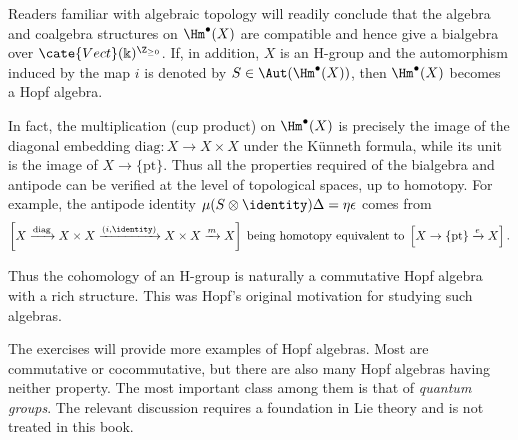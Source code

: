 \begin{example}[H.\ Hopf]
	Readers familiar with algebraic topology will readily conclude that the
	algebra and coalgebra structures on $\Hm^\bullet(X)$ are compatible and
	hence give a bialgebra over
	$\cate{Vect}(\Bbbk)^{\Z_{\geq0}}$. If, in addition, $X$ is an H-group and
	the automorphism induced by the map $i$ is denoted by
	$S\in\Aut(\Hm^\bullet(X))$, then $\Hm^\bullet(X)$ becomes a Hopf algebra.

	In fact, the multiplication (cup product) on $\Hm^\bullet(X)$ is precisely
	the image of the diagonal embedding $\mathrm{diag}:X\to X\times X$ under
	the Künneth formula, while its unit is the image of
	$X\to\{\mathrm{pt}\}$. Thus all the properties required of the bialgebra
	and antipode can be verified at the level of topological spaces, up to
	homotopy. For example, the antipode identity
	$\mu(S\otimes\identity)\Delta=\eta\epsilon$ comes from
	\[ \left[ X \xrightarrow{\mathrm{diag}} X \times X \xrightarrow{(i, \identity)} X \times X \xrightarrow{m} X\right] \;\text{being homotopy equivalent to}\; \left[ X \to \{\mathrm{pt}\} \xrightarrow{e} X \right]. \]

	Thus the cohomology of an H-group is naturally a commutative Hopf algebra
	with a rich structure. This was Hopf's original motivation for studying
	such algebras.
\end{example}

The exercises will provide more examples of Hopf algebras. Most are
commutative or cocommutative, but there are also many Hopf algebras having
neither property. The most important class among them is that of
\emph{quantum groups}. The relevant discussion requires a foundation in Lie
theory and is not treated in this book.
